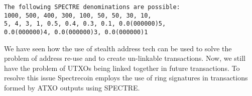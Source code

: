 \begin{lstlisting}
The following SPECTRE denominations are possible:
1000, 500, 400, 300, 100, 50, 50, 30, 10,
5, 4, 3, 1, 0.5, 0.4, 0.3, 0.1, 0.0(000000)5,
0.0(000000)4, 0.0(000000)3, 0.0(000000)1
\end{lstlisting}



We have seen how the use of stealth address tech can be used to solve the
problem of address re-use and to create un-linkable transactions. Now, we
still have the problem of UTXOs being linked together in future transactions.
To resolve this issue Spectrecoin employs the use of ring signatures in
transactions formed by ATXO outputs using SPECTRE.
